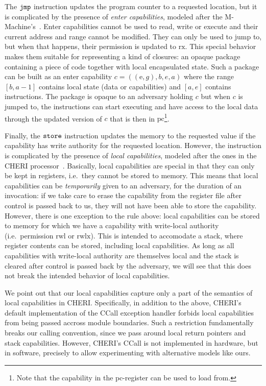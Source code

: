 \documentclass[compsoc,conference,letterpaper,fleqn]{IEEEtran}
\newcommand\lau[1]{{\color{purple} \sf \footnotesize {LS: #1}}\\}
\newcommand{\var}[1]{\mathit{#1}}
\newcommand{\gl}{\var{g}}
\newcommand{\pcreg}{\mathrm{pc}}
\newcommand{\addr}{\var{a}}
\newcommand{\start}{\var{b}}
\newcommand{\addrend}{\var{e}}
\newcommand{\zinstr}[1]{\mathtt{#1}}
\newcommand{\oneinstr}[2]{
  \ifthenelse{\equal{#2}{}}
  {\zinstr{#1}}
  {\zinstr{#1} \; #2}
}
\newcommand{\jmp}[1]{\oneinstr{jmp}{#1}}
\newcommand{\twoinstr}[3]{
  \ifthenelse{\equal{#2#3}{}}
  {\zinstr{#1}}
  {\zinstr{#1} \; #2 \; #3}
}
\newcommand{\store}[2]{\twoinstr{store}{#1}{#2}}
\newcommand{\plainperm}[1]{\mathrm{#1}}
\newcommand{\exec}{\plainperm{rx}}
\newcommand{\entry}{\plainperm{e}}
\newcommand{\readwritel}{\plainperm{rwl}}
\newcommand{\rwl}{\readwritel}
\newcommand{\rwlx}{\plainperm{rwlx}}
\begin{document}
The $\jmp{}$ instruction updates the program counter to a requested location,
but it is complicated by the presence of \emph{enter capabilities}, modeled
after the M-Machine's~\cite{Carter:1994:HSF:195473.195579}. Enter capabilities
cannot be used to read, write or execute and their current address and range
cannot be modified. They can only be used to jump to, but when that happens,
their permission is updated to $\exec$. This special behavior makes them
suitable for representing a kind of closures: an opaque package containing a
piece of code together with local encapsulated state. Such a package can be
built as an enter capability $c = ((\entry,\gl),\start,\addrend,\addr)$ where
the range $[\start,\addr-1]$ contains local state (data or capabilities) and
$[\addr,\addrend]$ contains instructions. The package is opaque to an adversary
holding $c$ but when $c$ is jumped to, the instructions can start executing and
have access to the local data through the updated version of $c$ that is then in
$\pcreg$\footnote{Note that the capability in the $\pcreg$-register can be used
  to load from.}.

Finally, the $\store{}{}$ instruction updates the memory to the requested value
if the capability has write authority for the requested location. However, the
instruction is complicated by the presence of \emph{local capabilities}, modeled
after the ones in the CHERI processor~\cite{Watson2015Cheri}. Basically, local
capabilities are special in that they can only be kept in registers, i.e.\ they
cannot be stored to memory. This means that local capabilities can be
\emph{temporarily} given to an adversary, for the duration of an invocation: if
we take care to erase the capability from the register file after control is
passed back to us, they will not have been able to store the capability.
However, there is one exception to the rule above: local capabilities can be
stored to memory for which we have a capability with write-local authority
(i.e.\ permission $\rwl$ or $\rwlx$). This is intended to accomodate a stack,
where register contents can be stored, including local capabilities. As long as all
capabilities with write-local authority are themselves local and the stack is
cleared after control is passed back by the adversary, we will see that this
does not break the intended behavior of local capabilities.

We point out that our local capabilities capture only a part of the semantics of
local capabilities in CHERI. Specifically, in addition to the above, CHERI's
default implementation of the CCall exception handler forbids local capabilities
from being passed accross module boundaries. Such a restriction fundamentally
breaks our calling convention, since we pass around local return pointers and
stack capabilities. However, CHERI's CCall is not implemented in hardware, but
in software, precisely to allow experimenting with alternative models like ours.
\end{document}

